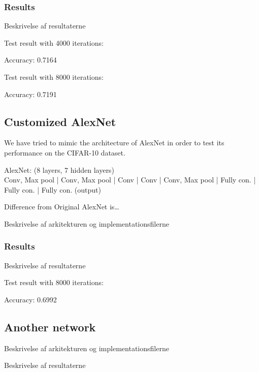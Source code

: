 \subsubsection{Results}
Beskrivelse af resultaterne


Test result with 4000 iterations:

Accuracy: 0.7164 

Test result with 8000 iterations:

Accuracy: 0.7191 



\subsection{Customized AlexNet} %
\label{sub:alexNet}

We have tried to mimic the architecture of AlexNet\cite{AlexNet} in order to
test its performance on the CIFAR-10 dataset. 


AlexNet: (8 layers, 7 hidden layers) \\
 Conv, Max pool | Conv, Max pool | Conv | Conv | Conv, Max pool |
Fully con. | Fully con. | Fully con. (output) 

Difference from Original AlexNet is\ldots

Beskrivelse af arkitekturen og implementationsfilerne

\subsubsection{Results}
Beskrivelse af resultaterne

Test result with 8000 iterations:

Accuracy: 0.6992


\subsection{Another network} %
\label{sub:another_network}

Beskrivelse af arkitekturen og implementationsfilerne

Beskrivelse af resultaterne

